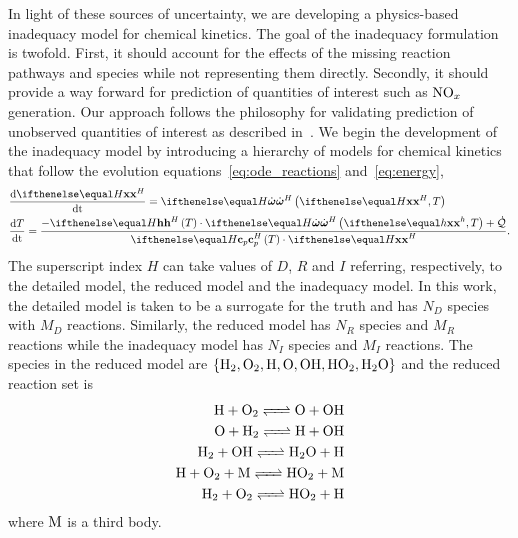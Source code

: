 \documentclass[fontsize=12pt, %
               paper=a4, %
               hyperref]{report}
\begin{document}
  In light of these sources of uncertainty, we are developing a physics-based inadequacy 
  model for chemical kinetics.  The goal of the inadequacy formulation is twofold.  First, 
  it should account for the effects of the missing reaction pathways and species while not 
  representing them directly.  Secondly, it should provide a way forward for prediction 
  of quantities of interest such as $\ce{NO_x}$ generation.  Our approach follows the 
  philosophy for validating prediction of unobserved quantities of interest as described 
  in~\cite{oliver2015validating}.  We begin the development of the inadequacy model by 
  introducing a hierarchy of models for chemical kinetics that follow the evolution 
  equations~\eqref{eq:ode_reactions} and~\eqref{eq:energy}, 
  \begin{align}
    &\odeone{\xc[H]}{\time} = \rr[H]\lr{\xc[H],T} \\
    &\odeone{T}{\time} = \dfrac{-\displaystyle\enth[H]\lr{T}\cdot\rr[H]\lr{\xc[h],T} + \heating}
                              {\displaystyle\cp[H]\lr{T}\cdot\xc[H]}.
  \end{align}
  The superscript index $H$ can take values of $D$, $R$ and $I$ referring, respectively, to 
  the detailed model, the reduced model and the inadequacy model.  In this work, the detailed 
  model is taken to be a surrogate for the truth and has $N_{D}$ species with $M_{D}$ reactions.
  Similarly, the reduced model has $N_{R}$ species and $M_{R}$ reactions while the inadequacy 
  model has $N_{I}$ species and $M_{I}$ reactions.  The species in the reduced model are 
  $\left\{\ce{H2}, \ce{O2}, \ce{H}, \ce{O}, \ce{OH}, \ce{HO2}, \ce{H2O}\right\}$ and the 
  reduced reaction set is 
  \begin{align*}
    \ce{H + O2 <=> O + OH} \\
    \ce{O + H2 <=> H + OH} \\
    \ce{H2 + OH <=> H2O + H} \\
    \ce{H + O2 + M <=> HO2 + M} \\
    \ce{H2 + O2 <=> HO2 + H}
  \end{align*}
  where $\ce{M}$ is a third body.
  
\end{document}
